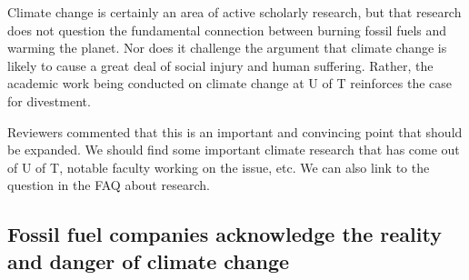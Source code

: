 Climate change is certainly an area of active scholarly research, but that research does not question the fundamental connection between burning fossil fuels and warming the planet. 
Nor does it challenge the argument that climate change is likely to cause a great deal of social injury and human suffering.
Rather, the academic work being conducted on climate change at U of T reinforces the case for divestment.


\begin{vcom}
Reviewers commented that this is an important and convincing point that should be expanded. We should find some important climate research that has come out of U of T, notable faculty working on the issue, etc. We can also link to the question in the FAQ about research.
\end{vcom}



	\subsection{Fossil fuel companies acknowledge the reality and danger of climate change}




	

